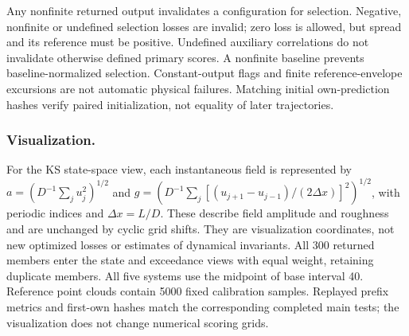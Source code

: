 \documentclass[gmd,manuscript]{copernicus}
\begin{document}
Any nonfinite returned output invalidates a configuration for selection. Negative, nonfinite or undefined selection losses are invalid; zero loss is allowed, but spread and its reference must be positive. Undefined auxiliary correlations do not invalidate otherwise defined primary scores. A nonfinite baseline prevents baseline-normalized selection. Constant-output flags and finite reference-envelope excursions are not automatic physical failures. Matching initial own-prediction hashes verify paired initialization, not equality of later trajectories.

\subsubsection{Visualization.}
For the KS state-space view, each instantaneous field is represented by $a=(D^{-1}\sum_j u_j^2)^{1/2}$ and $g=(D^{-1}\sum_j [(u_{j+1}-u_{j-1})/(2\Delta x)]^2)^{1/2}$, with periodic indices and $\Delta x=L/D$. These describe field amplitude and roughness and are unchanged by cyclic grid shifts. They are visualization coordinates, not new optimized losses or estimates of dynamical invariants. All 300 returned members enter the state and exceedance views with equal weight, retaining duplicate members. All five systems use the midpoint of base interval 40. Reference point clouds contain 5000 fixed calibration samples. Replayed prefix metrics and first-own hashes match the corresponding completed main tests; the visualization does not change numerical scoring grids.
\end{document}
